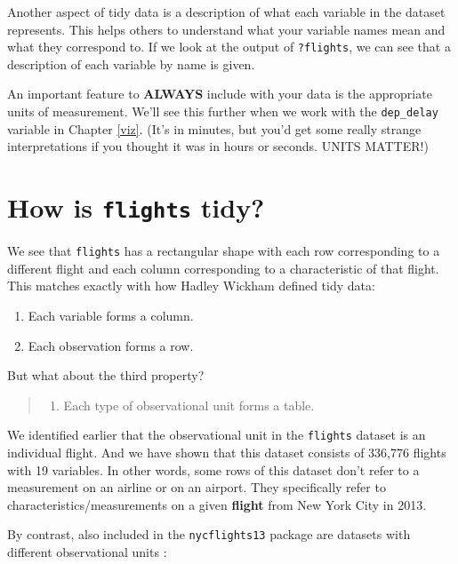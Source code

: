 \documentclass[]{tufte-book}
\providecommand{\tightlist}{%
  \setlength{\itemsep}{0pt}\setlength{\parskip}{0pt}}
\begin{document}
Another aspect of tidy data is a description of what each variable in
the dataset represents. This helps others to understand what your
variable names mean and what they correspond to. If we look at the
output of \texttt{?flights}, we can see that a description of each
variable by name is given.

An important feature to \textbf{ALWAYS} include with your data is the
appropriate units of measurement. We'll see this further when we work
with the \texttt{dep\_delay} variable in Chapter \ref{viz}. (It's in
minutes, but you'd get some really strange interpretations if you
thought it was in hours or seconds. UNITS MATTER!)

\section{\texorpdfstring{How is \texttt{flights}
tidy?}{How is flights tidy?}}\label{how-is-flights-tidy}

We see that \texttt{flights} has a rectangular shape with each row
corresponding to a different flight and each column corresponding to a
characteristic of that flight. This matches exactly with how Hadley
Wickham defined tidy data:

\begin{enumerate}
\def\labelenumi{\arabic{enumi}.}
\tightlist
\item
  Each variable forms a column.
\item
  Each observation forms a row.
\end{enumerate}

But what about the third property?

\begin{quote}
\begin{enumerate}
\def\labelenumi{\arabic{enumi}.}
\setcounter{enumi}{2}
\tightlist
\item
  Each type of observational unit forms a table.
\end{enumerate}
\end{quote}

We identified earlier that the observational unit in the
\texttt{flights} dataset is an individual flight. And we have shown that
this dataset consists of 336,776 flights with 19 variables. In other
words, some rows of this dataset don't refer to a measurement on an
airline or on an airport. They specifically refer to
characteristics/measurements on a given \textbf{flight} from New York
City in 2013.

By contrast, also included in the \texttt{nycflights13} package are
datasets with different observational units \citep{R-nycflights13}:
\end{document}

